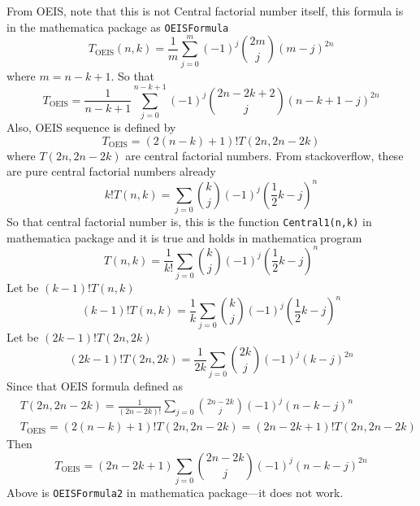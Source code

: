 From OEIS, note that this is not Central factorial number itself, this formula is in the mathematica package as
\texttt{OEISFormula}
\begin{equation*}
    T_{\mathrm{OEIS}} (n,k) = \frac{1}{m} \sum_{j=0}^{m} (-1)^{j} \binom{2m}{j} (m-j)^{2n}
\end{equation*}
where $m=n-k+1$.
So that
\begin{equation*}
    T_{\mathrm{OEIS}} = \frac{1}{n-k+1} \sum_{j=0}^{n-k+1} (-1)^{j} \binom{2n-2k+2}{j} (n-k+1-j)^{2n}
\end{equation*}
Also, OEIS sequence is defined by
\begin{equation*}
    T_{\mathrm{OEIS}} = (2(n-k) + 1)! T(2n, 2n-2k)
\end{equation*}
where $T(2n, 2n-2k)$ are central factorial numbers.
From stackoverflow, these are pure central factorial numbers already
\begin{equation*}
    k! T(n,k) = \sum_{j=0} \binom{k}{j} (-1)^{j} \left( \frac{1}{2}k - j \right)^{n}
\end{equation*}
So that central factorial number is, this is the function \texttt{Central1(n,k)} in mathematica package
and it is true and holds in mathematica program
\begin{equation*}
    T(n,k) = \frac{1}{k!} \sum_{j=0} \binom{k}{j} (-1)^{j} \left( \frac{1}{2}k - j \right)^{n}
\end{equation*}
Let be $(k-1)! T(n,k)$
\begin{equation*}
(k-1)
    !T(n,k) = \frac{1}{k} \sum_{j=0} \binom{k}{j} (-1)^{j} \left( \frac{1}{2}k - j \right)^{n}
\end{equation*}
Let be $(2k-1)! T(2n, 2k)$
\begin{equation*}
(2k-1)!T(2n, 2k) = \frac{1}{2k} \sum_{j=0} \binom{2k}{j} (-1)^{j} (k-j)^{2n}
\end{equation*}
Since that OEIS formula defined as
\begin{equation*}
    \begin{split}
        &T(2n, 2n-2k) = \frac{1}{(2n-2k)!} \sum_{j=0} \binom{2n-2k}{j} (-1)^{j} \left( n - k - j \right)^{n} \\
        &T_{\mathrm{OEIS}} = (2(n-k) + 1)! T(2n, 2n-2k) = (2n-2k+1)! T(2n, 2n-2k)
    \end{split}
\end{equation*}
Then
\begin{equation*}
    T_{\mathrm{OEIS}} = (2n-2k+1) \sum_{j=0} \binom{2n-2k}{j} (-1)^{j} (n-k-j)^{2n}
\end{equation*}
Above is \texttt{OEISFormula2} in mathematica package—it does not work.